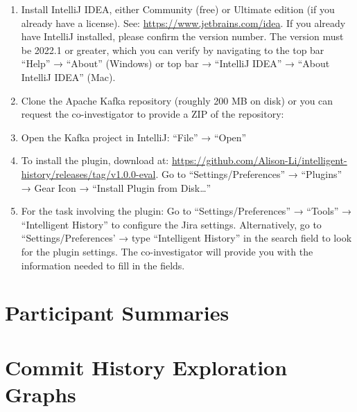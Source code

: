 \begin{enumerate}
    \item Install IntelliJ IDEA, either Community (free) or Ultimate edition (if you already have a license). See: \url{https://www.jetbrains.com/idea}. If you already have IntelliJ installed, please confirm the version number. The version must be 2022.1 or greater, which you can verify by navigating to the top bar  ``Help'' → ``About'' (Windows) or top bar → ``IntelliJ IDEA'' → ``About IntelliJ IDEA'' (Mac).
    \item Clone the Apache Kafka repository (roughly 200 MB on disk) or you can request the co-investigator to provide a ZIP of the repository: 
    
    \begin{center}
    \end{center}

    \item Open the Kafka project in IntelliJ: ``File'' → ``Open''
    \item To install the plugin, download  at: \url{https://github.com/Alison-Li/intelligent-history/releases/tag/v1.0.0-eval}. Go to “Settings/Preferences” → ``Plugins'' → Gear Icon → ``Install Plugin from Disk\dots''
    \item For the task involving the plugin: Go to ``Settings/Preferences'' → ``Tools'' → ``Intelligent History'' to configure the Jira settings. Alternatively, go to “Settings/Preferences’ → type ``Intelligent History'' in the search field to look for the plugin settings. The co-investigator will provide you with the information needed to fill in the fields.
\end{enumerate}


\section{Participant Summaries}
\label{sec:Participant-Summaries}



\section{Commit History Exploration Graphs}
\label{sec:All-Exploration-Graphs}


\endinput